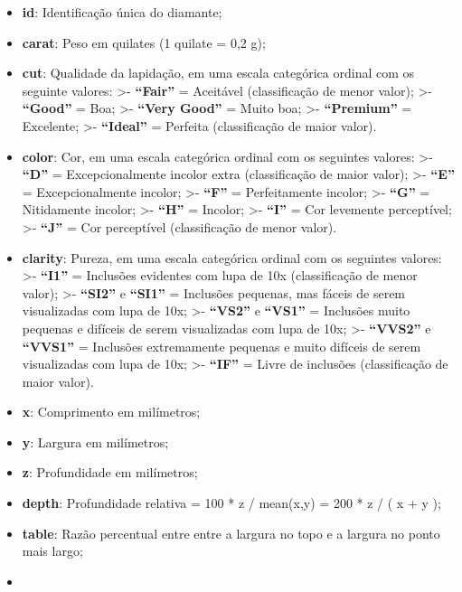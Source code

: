 \documentclass[11pt]{article}
\begin{document}
\begin{itemize}
\item
  \textbf{id}: Identificação única do diamante;
\item
  \textbf{carat}: Peso em quilates (1 quilate = 0,2 g);
\item
  \textbf{cut}: Qualidade da lapidação, em uma escala categórica ordinal
  com os seguinte valores: \textgreater{}- \textbf{``Fair''} = Aceitável
  (classificação de menor valor); \textgreater{}- \textbf{``Good''} =
  Boa; \textgreater{}- \textbf{``Very Good''} = Muito boa;
  \textgreater{}- \textbf{``Premium''} = Excelente; \textgreater{}-
  \textbf{``Ideal''} = Perfeita (classificação de maior valor).
\item
  \textbf{color}: Cor, em uma escala categórica ordinal com os seguintes
  valores: \textgreater{}- \textbf{``D''} = Excepcionalmente incolor
  extra (classificação de maior valor); \textgreater{}- \textbf{``E''} =
  Excepcionalmente incolor; \textgreater{}- \textbf{``F''} =
  Perfeitamente incolor; \textgreater{}- \textbf{``G''} = Nitidamente
  incolor; \textgreater{}- \textbf{``H''} = Incolor; \textgreater{}-
  \textbf{``I''} = Cor levemente perceptível; \textgreater{}-
  \textbf{``J''} = Cor perceptível (classificação de menor valor).
\item
  \textbf{clarity}: Pureza, em uma escala categórica ordinal com os
  seguintes valores: \textgreater{}- \textbf{``I1''} = Inclusões
  evidentes com lupa de 10x (classificação de menor valor);
  \textgreater{}- \textbf{``SI2''} e \textbf{``SI1''} = Inclusões
  pequenas, mas fáceis de serem visualizadas com lupa de 10x;
  \textgreater{}- \textbf{``VS2''} e \textbf{``VS1''} = Inclusões muito
  pequenas e difíceis de serem visualizadas com lupa de 10x;
  \textgreater{}- \textbf{``VVS2''} e \textbf{``VVS1''} = Inclusões
  extremamente pequenas e muito difíceis de serem visualizadas com lupa
  de 10x; \textgreater{}- \textbf{``IF''} = Livre de inclusões
  (classificação de maior valor).
\item
  \textbf{x}: Comprimento em milímetros;
\item
  \textbf{y}: Largura em milímetros;
\item
  \textbf{z}: Profundidade em milímetros;
\item
  \textbf{depth}: Profundidade relativa = 100 * z / mean(x,y) = 200 * z
  / ( x + y );
\item
  \textbf{table}: Razão percentual entre entre a largura no topo e a
  largura no ponto mais largo;
\item ~
  \hypertarget{price-preuxe7o-do-diamante-em-duxf3lares-americanos.}{%
}
\end{itemize}
\end{document}
